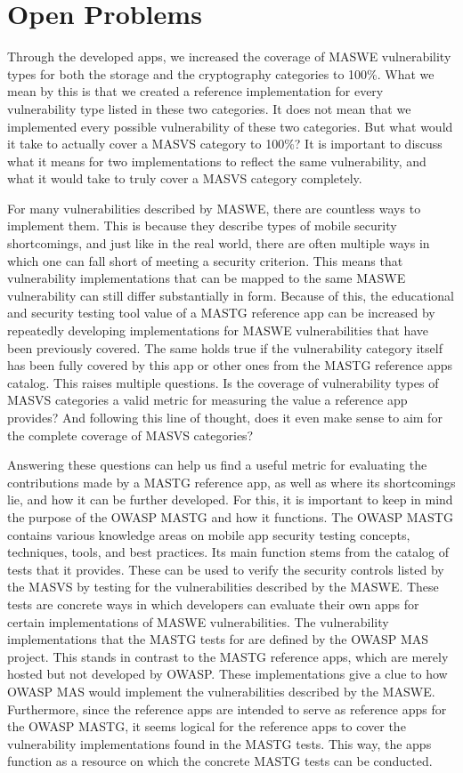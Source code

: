 \section{Open Problems}
Through the developed apps, we increased the coverage of MASWE vulnerability types for both the storage and the cryptography categories to 100\%. What we mean by this is that we created a reference implementation for every vulnerability type listed in these two categories. It does not mean that we implemented every possible vulnerability of these two categories. But what would it take to actually cover a MASVS category to 100\%? It is important to discuss what it means for two implementations to reflect the same vulnerability, and what it would take to truly cover a MASVS category completely.

For many vulnerabilities described by MASWE, there are countless ways to implement them. This is because they describe types of mobile security shortcomings, and just like in the real world, there are often multiple ways in which one can fall short of meeting a security criterion. This means that vulnerability implementations that can be mapped to the same MASWE vulnerability can still differ substantially in form. Because of this, the educational and security testing tool value of a MASTG reference app can be increased by repeatedly developing implementations for MASWE vulnerabilities that have been previously covered. The same holds true if the vulnerability category itself has been fully covered by this app or other ones from the MASTG reference apps catalog. This raises multiple questions. Is the coverage of vulnerability types of MASVS categories a valid metric for measuring the value a reference app provides? And following this line of thought, does it even make sense to aim for the complete coverage of MASVS categories? 

Answering these questions can help us find a useful metric for evaluating the contributions made by a MASTG reference app, as well as where its shortcomings lie, and how it can be further developed. For this, it is important to keep in mind the purpose of the OWASP MASTG and how it functions. The OWASP MASTG contains various knowledge areas on mobile app security testing concepts, techniques, tools, and best practices. Its main function stems from the catalog of tests that it provides. These can be used to verify the security controls listed by the MASVS by testing for the vulnerabilities described by the MASWE. These tests are concrete ways in which developers can evaluate their own apps for certain implementations of MASWE vulnerabilities. The vulnerability implementations that the MASTG tests for are defined by the OWASP MAS project. This stands in contrast to the MASTG reference apps, which are merely hosted but not developed by OWASP. These implementations give a clue to how OWASP MAS would implement the vulnerabilities described by the MASWE. Furthermore, since the reference apps are intended to serve as reference apps for the OWASP MASTG, it seems logical for the reference apps to cover the vulnerability implementations found in the MASTG tests. This way, the apps function as a resource on which the concrete MASTG tests can be conducted.

